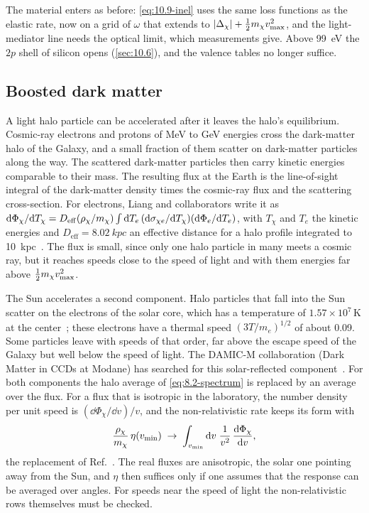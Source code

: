 The material enters as before: \cref{eq:10.9-inel} uses the same loss functions as the elastic rate, now on a grid of $\omega$ that extends to $|\Delta_\chi| + \tfrac12m_{\chi} v_{\mathrm{max}}^2$, and the light-mediator line needs the optical limit, which measurements give. Above \SI{99}{eV} the $2p$ shell of silicon opens (\cref{sec:10.6}), and the valence tables no longer suffice.

\subsection{Boosted dark matter}\label{sec:10.9-boosted}

A light halo particle can be accelerated after it leaves the halo's equilibrium. Cosmic-ray electrons and protons of MeV to GeV energies cross the dark-matter halo of the Galaxy, and a small fraction of them scatter on dark-matter particles along the way. The scattered dark-matter particles then carry kinetic energies comparable to their mass. The resulting flux at the Earth is the line-of-sight integral of the dark-matter density times the cosmic-ray flux and the scattering cross-section. For electrons, Liang and collaborators write it as $\mathrm{d}\Phi_\chi/\mathrm{d} T_\chi = D_{\mathrm{eff}}(\rho_\chi/m_{\chi})\int\mathrm{d} T_e\,(\mathrm{d}\sigma_{\chi e}/\mathrm{d} T_\chi)(\mathrm{d}\Phi_e/\mathrm{d} T_e)$, with $T_\chi$ and $T_e$ the kinetic energies and $D_{\mathrm{eff}} = \SI{8.02}{kpc}$ an effective distance for a halo profile integrated to \SI{10}{kpc}~\cite[Eq.~(1)]{liang2025plasmon}. The flux is small, since only one halo particle in many meets a cosmic ray, but it reaches speeds close to the speed of light and with them energies far above $\tfrac12m_{\chi} v_{\mathrm{max}}^2$.

The Sun accelerates a second component. Halo particles that fall into the Sun scatter on the electrons of the solar core, which has a temperature of $1.57\times10^7$\,K at the center~\cite[Table~5]{bahcall2001solar}; these electrons have a thermal speed $(3T/m_e)^{1/2}$ of about 0.09. Some particles leave with speeds of that order, far above the escape speed of the Galaxy but well below the speed of light. The DAMIC-M collaboration (Dark Matter in CCDs at Modane) has searched for this solar-reflected component~\cite{aggarwal2026constraints}. For both components the halo average of \cref{eq:8.2-spectrum} is replaced by an average over the flux. For a flux that is isotropic in the laboratory, the number density per unit speed is $(\dd\Phi_\chi/\dd v)/v$, and the non-relativistic rate keeps its form with
\begin{equation*}
  \frac{\rho_\chi}{m_{\chi}}\,\eta(v_{\mathrm{min}}) \;\to\; \int_{v_{\mathrm{min}}}\mathrm{d} v\;\frac{1}{v^2}\,\frac{\mathrm{d}\Phi_\chi}{\mathrm{d} v} ,
\end{equation*}
the replacement of Ref.~\cite[Eqs.~(9)--(11)]{aggarwal2026constraints}. The real fluxes are anisotropic, the solar one pointing away from the Sun, and $\eta$ then suffices only if one assumes that the response can be averaged over angles. For speeds near the speed of light the non-relativistic rows themselves must be checked.

